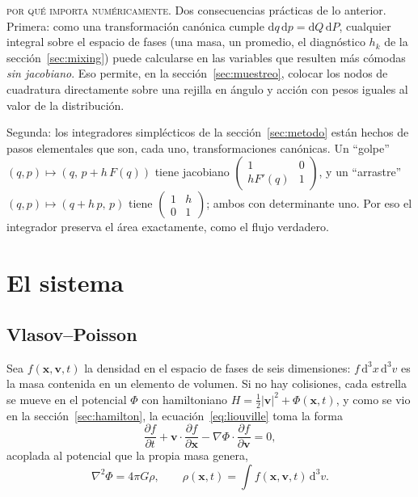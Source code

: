 \documentclass[11pt,a4paper]{article}
\newcommand{\dd}{\mathrm{d}}
\theoremstyle{definition}
\begin{document}
\begin{aviso}
\textsc{por qué importa numéricamente.} Dos consecuencias prácticas de lo anterior.
Primera: como una transformación canónica cumple $\dd q\,\dd p=\dd Q\,\dd P$,
cualquier integral sobre el espacio de fases (una masa, un promedio, el diagnóstico
$h_k$ de la sección~\ref{sec:mixing}) puede calcularse en las variables que resulten
más cómodas \emph{sin jacobiano}. Eso permite, en la sección~\ref{sec:muestreo},
colocar los nodos de cuadratura directamente sobre una rejilla en ángulo y acción con
pesos iguales al valor de la distribución.

Segunda: los integradores simplécticos de la sección~\ref{sec:metodo} están hechos
de pasos elementales que son, cada uno, transformaciones canónicas. Un ``golpe''
$(q,p)\mapsto(q,\,p+h\,F(q))$ tiene jacobiano
$\left(\begin{smallmatrix}1&0\\hF'(q)&1\end{smallmatrix}\right)$, y un ``arrastre''
$(q,p)\mapsto(q+h\,p,\,p)$ tiene
$\left(\begin{smallmatrix}1&h\\0&1\end{smallmatrix}\right)$; ambos con determinante
uno. Por eso el integrador preserva el área exactamente, como el flujo verdadero.
\end{aviso}

\section{El sistema}
\label{sec:sistema}

\subsection{Vlasov--Poisson}

Sea $f(\mathbf{x},\mathbf{v},t)$ la densidad en el espacio de fases de seis
dimensiones: $f\,\dd^3x\,\dd^3v$ es la masa contenida en un elemento de volumen. Si
no hay colisiones, cada estrella se mueve en el potencial $\Phi$ con hamiltoniano
$H=\tfrac12|\mathbf{v}|^2+\Phi(\mathbf{x},t)$, y como se vio en la
sección~\ref{sec:hamilton}, la ecuación~\eqref{eq:liouville} toma la forma
\begin{equation}
  \frac{\partial f}{\partial t}
  + \mathbf{v}\cdot\frac{\partial f}{\partial \mathbf{x}}
  - \nabla\Phi\cdot\frac{\partial f}{\partial \mathbf{v}} = 0 ,
  \label{eq:vlasov}
\end{equation}
acoplada al potencial que la propia masa genera,
\begin{equation}
  \nabla^2\Phi = 4\pi G \rho, \qquad
  \rho(\mathbf{x},t) = \int f(\mathbf{x},\mathbf{v},t)\,\dd^3 v .
  \label{eq:poisson}
\end{equation}
\end{document}
